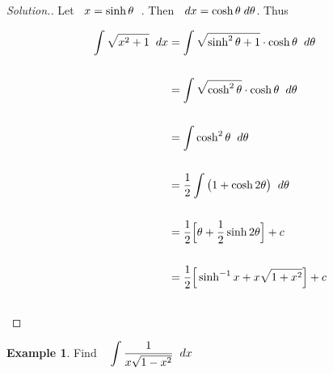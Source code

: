 \documentclass[11pt,a4paper]{article}
\theoremstyle{definition}
\newtheorem{exa}[thm]{Example}
\newenvironment{solution}
  {\renewcommand{\qedsymbol}{}\begin{proof}[\textit{Solution}.]}
  {\end{proof}}
\begin{document}
\begin{solution}


Let $\hspace{0.2cm} x = \sinh \theta\hspace{0.2cm}$. Then $\hspace{0.2cm} dx = \cosh \theta \hspace{0.1cm}d\theta$. Thus 

\begin{align*}
\int \sqrt{x^2 + 1}\hspace{0.2cm}dx & = \int \sqrt{\sinh^2 \theta + 1}\cdot \cosh\theta \hspace{0.2cm} d\theta\\\\
& = \int \sqrt{\cosh^2\theta}\cdot \cosh \theta \hspace{0.2cm}d\theta\\\\
& = \int \cosh^2 \theta \hspace{0.2cm}d\theta\\\\
& = \dfrac{1}{2}\int \big(1 + \cosh 2 \theta \big) \hspace{0.2cm}d\theta\\\\
& = \dfrac{1}{2}\Big[ \theta + \dfrac{1}{2} \sinh 2\theta \Big] + c\\\\
& = \dfrac{1}{2}\Big[\sinh^{-1}x + x\sqrt{1 + x^2}\Big] + c\\\\
\end{align*}
\end{solution}

\begin{exa}


Find $\hspace{0.3cm} \displaystyle{\int \dfrac{1}{x\sqrt{1 - x^2}}\hspace{0.2cm}dx}$
\end{exa}
\end{document}
